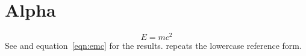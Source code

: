 \documentclass{article}
\begin{document}
\section{Alpha}\label{sec:alpha}
\begin{equation}\label{eqn:emc}E=mc^2\end{equation}
See  and equation~\ref{eqn:emc} for the results.
 repeats the lowercase reference form.
\end{document}
